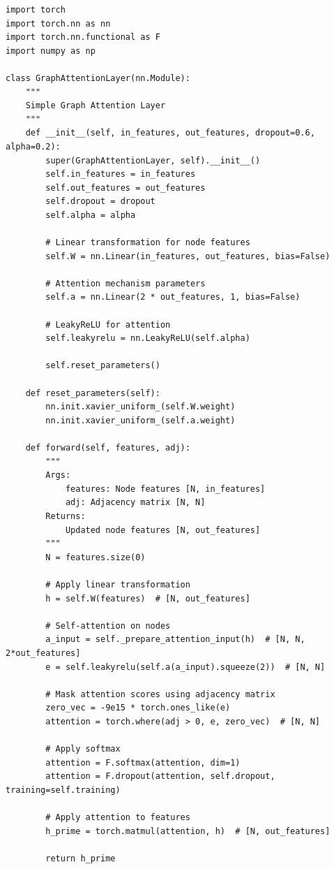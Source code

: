 \begin{lstlisting}[style=pythonstyle,title={Basic Gat Code},label={code:basic_gat}]
import torch
import torch.nn as nn
import torch.nn.functional as F
import numpy as np

class GraphAttentionLayer(nn.Module):
    """
    Simple Graph Attention Layer
    """
    def __init__(self, in_features, out_features, dropout=0.6, alpha=0.2):
        super(GraphAttentionLayer, self).__init__()
        self.in_features = in_features
        self.out_features = out_features
        self.dropout = dropout
        self.alpha = alpha
        
        # Linear transformation for node features
        self.W = nn.Linear(in_features, out_features, bias=False)
        
        # Attention mechanism parameters
        self.a = nn.Linear(2 * out_features, 1, bias=False)
        
        # LeakyReLU for attention
        self.leakyrelu = nn.LeakyReLU(self.alpha)
        
        self.reset_parameters()
    
    def reset_parameters(self):
        nn.init.xavier_uniform_(self.W.weight)
        nn.init.xavier_uniform_(self.a.weight)
    
    def forward(self, features, adj):
        """
        Args:
            features: Node features [N, in_features]
            adj: Adjacency matrix [N, N]
        Returns:
            Updated node features [N, out_features]
        """
        N = features.size(0)
        
        # Apply linear transformation
        h = self.W(features)  # [N, out_features]
        
        # Self-attention on nodes
        a_input = self._prepare_attention_input(h)  # [N, N, 2*out_features]
        e = self.leakyrelu(self.a(a_input).squeeze(2))  # [N, N]
        
        # Mask attention scores using adjacency matrix
        zero_vec = -9e15 * torch.ones_like(e)
        attention = torch.where(adj > 0, e, zero_vec)  # [N, N]
        
        # Apply softmax
        attention = F.softmax(attention, dim=1)
        attention = F.dropout(attention, self.dropout, training=self.training)
        
        # Apply attention to features
        h_prime = torch.matmul(attention, h)  # [N, out_features]
        
        return h_prime
    

\end{lstlisting}
